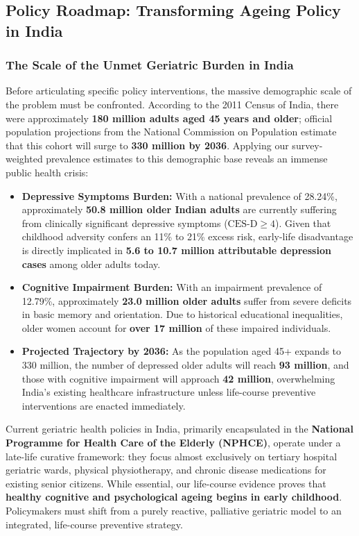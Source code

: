 \subsection{Policy Roadmap: Transforming Ageing Policy in India}

\subsubsection{The Scale of the Unmet Geriatric Burden in India}
Before articulating specific policy interventions, the massive demographic scale of the problem must be confronted. According to the 2011 Census of India, there were approximately \textbf{180 million adults aged 45 years and older}; official population projections from the National Commission on Population estimate that this cohort will surge to \textbf{330 million by 2036}. Applying our survey-weighted prevalence estimates to this demographic base reveals an immense public health crisis:

\begin{itemize}
    \item \textbf{Depressive Symptoms Burden:} With a national prevalence of 28.24\%, approximately \textbf{50.8 million older Indian adults} are currently suffering from clinically significant depressive symptoms ($\text{CES-D} \ge 4$). Given that childhood adversity confers an 11\% to 21\% excess risk, early-life disadvantage is directly implicated in \textbf{5.6 to 10.7 million attributable depression cases} among older adults today.
    \item \textbf{Cognitive Impairment Burden:} With an impairment prevalence of 12.79\%, approximately \textbf{23.0 million older adults} suffer from severe deficits in basic memory and orientation. Due to historical educational inequalities, older women account for \textbf{over 17 million} of these impaired individuals.
    \item \textbf{Projected Trajectory by 2036:} As the population aged 45+ expands to 330 million, the number of depressed older adults will reach \textbf{93 million}, and those with cognitive impairment will approach \textbf{42 million}, overwhelming India's existing healthcare infrastructure unless life-course preventive interventions are enacted immediately.
\end{itemize}

Current geriatric health policies in India, primarily encapsulated in the \textbf{National Programme for Health Care of the Elderly (NPHCE)}, operate under a late-life curative framework: they focus almost exclusively on tertiary hospital geriatric wards, physical physiotherapy, and chronic disease medications for existing senior citizens. While essential, our life-course evidence proves that \textbf{healthy cognitive and psychological ageing begins in early childhood}. Policymakers must shift from a purely reactive, palliative geriatric model to an integrated, life-course preventive strategy.

